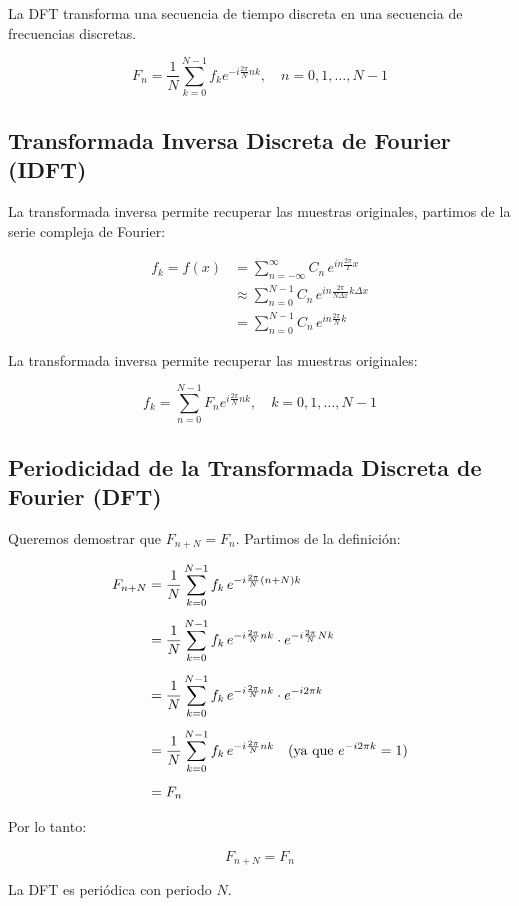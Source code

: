 La DFT transforma una secuencia de tiempo discreta en una secuencia de frecuencias discretas.

\[
F_n = \frac{1}{N} \sum_{k=0}^{N-1} f_k e^{-i \frac{2\pi}{N} nk}, \quad n = 0, 1, \ldots, N-1
\]

\subsection{Transformada Inversa Discreta de Fourier (IDFT)}

La transformada inversa permite recuperar las muestras originales, partimos de la serie compleja de Fourier:

\begin{align}
	f_k = f(x) &= \sum_{n=-\infty}^{\infty} C_n \, e^{i n \frac{2\pi}{T} x} \\[1ex]
	&\approx \sum_{n=0}^{N-1} C_n \, e^{i n \frac{2\pi}{N \Delta x} k \Delta x} \\[1ex]
	&= \sum_{n=0}^{N-1} C_n \, e^{i n \frac{2\pi}{N} k}
\end{align}


La transformada inversa permite recuperar las muestras originales:

\[
f_k = \sum_{n=0}^{N-1} F_n e^{i \frac{2\pi}{N} nk}, \quad k = 0, 1, \ldots, N-1
\]

\subsection{Periodicidad de la Transformada Discreta de Fourier (DFT)}

Queremos demostrar que \( F_{n+N} = F_n \). Partimos de la definición:

\begin{align}
	F_{n+N} &= \frac{1}{N} \sum_{k=0}^{N-1} f_k \, e^{-i \frac{2\pi}{N} (n+N)k} \\[1ex]
	&= \frac{1}{N} \sum_{k=0}^{N-1} f_k \, e^{-i \frac{2\pi}{N} nk} \cdot e^{-i \frac{2\pi}{N} Nk} \\[1ex]
	&= \frac{1}{N} \sum_{k=0}^{N-1} f_k \, e^{-i \frac{2\pi}{N} nk} \cdot e^{-i 2\pi k} \\[1ex]
	&= \frac{1}{N} \sum_{k=0}^{N-1} f_k \, e^{-i \frac{2\pi}{N} nk} \quad \text{(ya que \( e^{-i 2\pi k} = 1 \))} \\[1ex]
	&= F_n
\end{align}

Por lo tanto:

\[
F_{n+N} = F_n
\]

La DFT es periódica con periodo \( N \).



